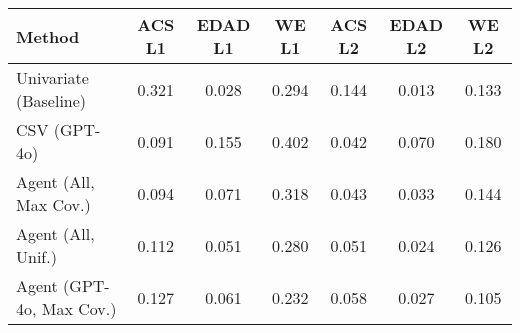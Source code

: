 \begin{tabular}{lcccccc}
\toprule
Method & ACS L1 & EDAD L1 & WE L1 & ACS L2 & EDAD L2 & WE L2 \\
\midrule
Univariate (Baseline) & 0.321 & \cellcolor{gold!30}0.028 & \cellcolor{bronze!30}0.294 & 0.144 & \cellcolor{gold!30}0.013 & \cellcolor{bronze!30}0.133 \\
CSV (GPT-4o) & \cellcolor{gold!30}0.091 & 0.155 & 0.402 & \cellcolor{gold!30}0.042 & 0.070 & 0.180 \\
Agent (All, Max Cov.) & \cellcolor{silver!30}0.094 & 0.071 & 0.318 & \cellcolor{silver!30}0.043 & 0.033 & 0.144 \\
Agent (All, Unif.) & \cellcolor{bronze!30}0.112 & \cellcolor{silver!30}0.051 & \cellcolor{silver!30}0.280 & \cellcolor{bronze!30}0.051 & \cellcolor{silver!30}0.024 & \cellcolor{silver!30}0.126 \\
Agent (GPT-4o, Max Cov.) & 0.127 & \cellcolor{bronze!30}0.061 & \cellcolor{gold!30}0.232 & 0.058 & \cellcolor{bronze!30}0.027 & \cellcolor{gold!30}0.105 \\
\bottomrule
\end{tabular}